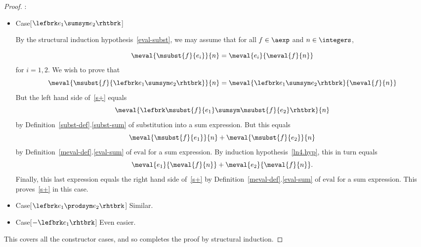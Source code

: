 \begin{definition}
\begin{proof}
:
\begin{itemize}

\item Case[$\lefbrk e_1 \sumsym e_2 \rhtbrk$]

  By the structural induction hypothesis~\eqref{eval-subst}, we may assume
  that for all $f \in \aexp$ and $n \in \integers$,

\begin{equation}\label{ln4.hyp}
\meval{\msubst{f}{e_i}}{n}  =  \meval{e_i}{\meval{f}{n}}
\end{equation}
for $i= 1,2$.  We wish to prove that
\begin{equation}\label{s+}
\meval{\msubst{f}{\lefbrk e_1\sumsym e_2 \rhtbrk}}{n}  =  \meval{\lefbrk e_1 \sumsym e_2 \rhtbrk}{ \meval{f}{n}}
\end{equation}
But the left hand side of~\eqref{s+} equals
\[
\meval{\lefbrk \msubst{f}{e_1} \sumsym \msubst{f}{e_2} \rhtbrk}{ n}
\]
by Definition~\ref{subst-def}.\ref{subst-sum} of substitution into a sum
expression.  But this equals
\[
\meval{\msubst{f}{e_1}}{n} + \meval{\msubst{f}{e_2}}{n}
\]
by Definition~\ref{meval-def}.\eqref{eval-sum} of $\text{eval}$ for a sum expression.  By
induction hypothesis~\eqref{ln4.hyp}, this in turn equals
\[
\meval{e_1}{\meval{f}{n}} + \meval{e_2}{\meval{f}{n}}.
\]
Finally, this last expression equals the right hand side of~\eqref{s+} by
Definition~\ref{meval-def}.\eqref{eval-sum} of $\text{eval}$ for a sum
expression.  This proves~\eqref{s+} in this case.

\item Case[$\lefbrk e_1 \prodsym e_2 \rhtbrk$]  Similar.

\item Case[$-\lefbrk e_1 \rhtbrk$]  Even easier.

\end{itemize}

This covers all the constructor cases, and so completes the proof by
structural induction.

\end{proof}

\begin{problems}
\practiceproblems
{}

\homeworkproblems
{}
\end{problems}

\begin{editingnotes}


\end{editingnotes}
\end{definition}
